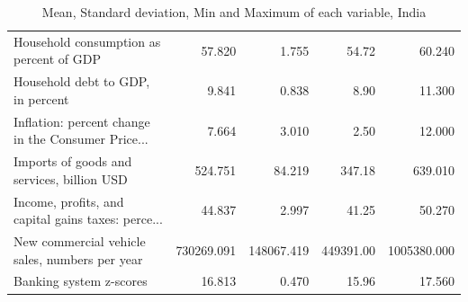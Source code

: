 \documentclass[11pt]{article}
\begin{document}
\begin{table}[H]
\begin{tabular}{lrrrr}
Household consumption as percent of GDP            &      57.820 &       1.755 &      54.72 &       60.240 \\
Household debt to GDP, in percent                  &       9.841 &       0.838 &       8.90 &       11.300 \\
Inflation: percent change in the Consumer Price... &       7.664 &       3.010 &       2.50 &       12.000 \\
Imports of goods and services, billion USD         &     524.751 &      84.219 &     347.18 &      639.010 \\
Income, profits, and capital gains taxes: perce... &      44.837 &       2.997 &      41.25 &       50.270 \\
New commercial vehicle sales, numbers per year     &  730269.091 &  148067.419 &  449391.00 &  1005380.000 \\
Banking system z-scores                            &      16.813 &       0.470 &      15.96 &       17.560 \\
\bottomrule
\end{tabular}
\caption{Mean, Standard deviation, Min and Maximum of each variable, India}
\label{tab:describe_ind}
\end{table}

\newpage


\end{document}
